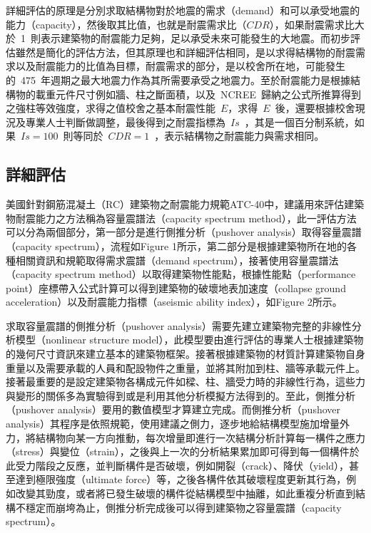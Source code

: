 詳細評估的原理是分別求取結構物對於地震的需求（demand）和可以承受地震的能力（capacity），然後取其比值，也就是耐震需求比（$CDR$），如果耐震需求比大於~1~則表示建築物的耐震能力足夠，足以承受未來可能發生的大地震。而初步評估雖然是簡化的評估方法，但其原理也和詳細評估相同，是以求得結構物的耐震需求以及耐震能力的比值為目標，耐震需求的部分，是以校舍所在地，可能發生的~475~年週期之最大地震力作為其所需要承受之地震力。至於耐震能力是根據結構物的載重元件尺寸例如牆、柱之斷面積，以及~NCREE~歸納之公式所推算得到之強柱等效強度，求得之值校舍之基本耐震性能~$E$，求得~$E$~後，還要根據校舍現況及專業人士判斷做調整，最後得到之耐震指標為~$Is$~，其是一個百分制系統，如果~$Is = 100$~則等同於~$CDR = 1$~，表示結構物之耐震能力與需求相同。




\subsection{詳細評估}

美國針對鋼筋混凝土（RC）建築物之耐震能力規範ATC-40\cite{applied1996seismic}中，建議用來評估建築物耐震能力之方法稱為容量震譜法（capacity spectrum method），此一評估方法可以分為兩個部分，第一部分是進行側推分析（pushover analysis）取得容量震譜（capacity spectrum），流程如Figure 1所示，第二部分是根據建築物所在地的各種相關資訊和規範取得需求震譜（demand spectrum），接著使用容量震譜法（capacity spectrum method）以取得建築物性能點，根據性能點（performance point）座標帶入公式計算可以得到建築物的破壞地表加速度（collapse ground acceleration）以及耐震能力指標（aseismic ability index），如Figure 2所示。

求取容量震譜的側推分析（pushover analysis）需要先建立建築物完整的非線性分析模型（nonlinear structure model），此模型要由進行評估的專業人士根據建築物的幾何尺寸資訊來建立基本的建築物框架。接著根據建築物的材質計算建築物自身重量以及需要承載的人員和配設物件之重量，並將其附加到柱、牆等承載元件上。接著最重要的是設定建築物各構成元件如樑、柱、牆受力時的非線性行為，這些力與變形的關係多為實驗得到或是利用其他分析模擬方法得到的。至此，側推分析（pushover analysis）要用的數值模型才算建立完成。而側推分析（pushover analysis）其程序是依照規範，使用建議之側力，逐步地給結構模型施加增量外力，將結構物向某一方向推動，每次增量即進行一次結構分析計算每一構件之應力（stress）與變位（strain），之後與上一次的分析結果累加即可得到每一個構件於此受力階段之反應，並判斷構件是否破壞，例如開裂（crack）、降伏（yield），甚至達到極限強度（ultimate force）等，之後各構件依其破壞程度更新其行為，例如改變其勁度，或者將已發生破壞的構件從結構模型中抽離，如此重複分析直到結構不穩定而崩垮為止，側推分析完成後可以得到建築物之容量震譜（capacity spectrum）。

